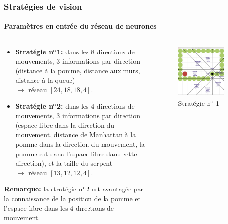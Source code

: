 \documentclass[10pt]{beamer}
\begin{document}
\begin{frame}
\frametitle{Stratégies de vision}
\framesubtitle{Paramètres en entrée du réseau de neurones}
\begin{columns}[T]
\begin{column}{0.60\textwidth}
\footnotesize
\begin{itemize}
\footnotesize
\item \textbf{Stratégie n$\textsuperscript{o}$1:} dans les 8 directions de mouvements, 3 informations par direction (distance à la pomme, distance aux murs, distance à la queue)\\
$\rightarrow$ réseau $\left[24, 18, 18, 4\right]$.
\item \textbf{Stratégie n$\textsuperscript{o}$2:} dans les 4 directions de mouvements, 3 informations par direction (espace libre dans la direction du mouvement, distance de Manhattan à la pomme dans la direction du mouvement, la pomme est dans l'espace libre dans cette direction), et la taille du serpent\\
$\rightarrow$ réseau $\left[13, 12, 12, 4\right]$.
\end{itemize}

\vspace{0.3cm}
\textbf{Remarque:} la stratégie n$\textsuperscript{o}$2 est avantagée par la connaissance de la position de la pomme et l'espace libre dans les 4 directions de mouvement.
\end{column}
\begin{column}{0.40\textwidth}

\begin{figure}
\vspace{-1.7cm}
\includegraphics[width=0.9\textwidth]{snake_vision_illustration2.png}
\caption*{\tiny Stratégie n\textsuperscript{o} 1}
\end{figure}


\end{column}
\end{columns}
\end{frame}
\end{document}
